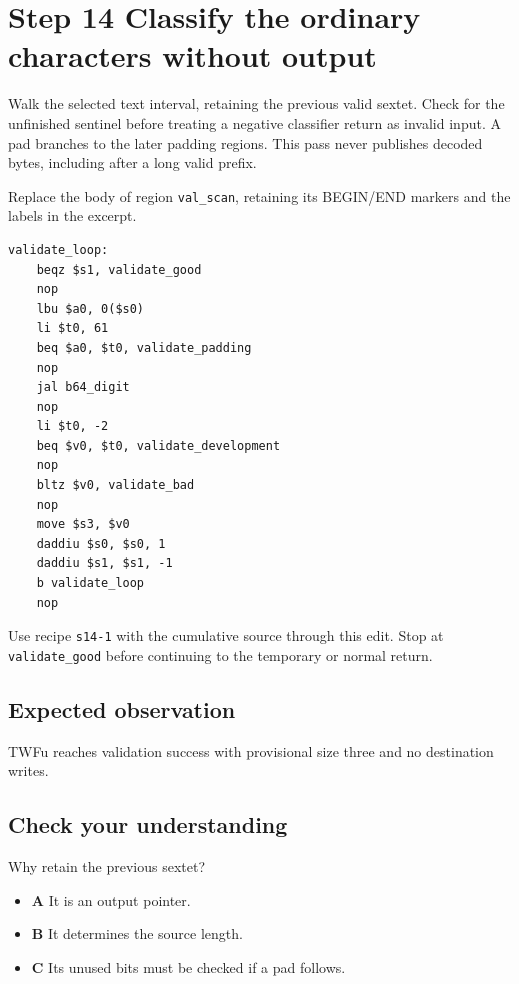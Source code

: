 \section{Step 14 Classify the ordinary characters without output}\label{base64-s14}

Walk the selected text interval, retaining the previous valid sextet. Check for the unfinished sentinel before treating a negative classifier return as invalid input. A pad branches to the later padding regions. This pass never publishes decoded bytes, including after a long valid prefix.

Replace the body of region \texttt{val\_scan}, retaining its BEGIN/END markers and the labels in the excerpt.

\begin{verbatim}
validate_loop:
    beqz $s1, validate_good
    nop
    lbu $a0, 0($s0)
    li $t0, 61
    beq $a0, $t0, validate_padding
    nop
    jal b64_digit
    nop
    li $t0, -2
    beq $v0, $t0, validate_development
    nop
    bltz $v0, validate_bad
    nop
    move $s3, $v0
    daddiu $s0, $s0, 1
    daddiu $s1, $s1, -1
    b validate_loop
    nop
\end{verbatim}

Use recipe \texttt{s14-1} with the cumulative source through this edit. Stop at \texttt{validate\_good} before continuing to the temporary or normal return.

\subsection{Expected observation}
TWFu reaches validation success with provisional size three and no destination writes.

\subsection{Check your understanding}
Why retain the previous sextet?

\begin{itemize}
  \item \textbf{A} It is an output pointer.
  \item \textbf{B} It determines the source length.
  \item \textbf{C} Its unused bits must be checked if a pad follows.
\end{itemize}
